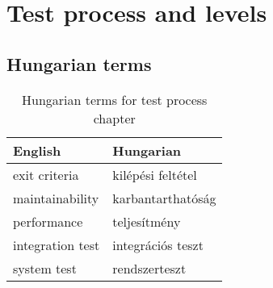\chapter{Test process and levels}



\section{Hungarian terms}

\begin{table}[ht]
    \centering
    \small
    \caption{Hungarian terms for test process chapter}
    \begin{tabular}{ll}
        \toprule
        \textbf{English} & \textbf{Hungarian} \\
        \midrule
        exit criteria & kilépési feltétel \\
        maintainability & karbantarthatóság \\
        performance & teljesítmény \\
        integration test & integrációs teszt \\
        system test & rendszerteszt \\
        \bottomrule
        \end{tabular}
        \label{tab:overview:hungarian-terms-test-process}
\end{table} 